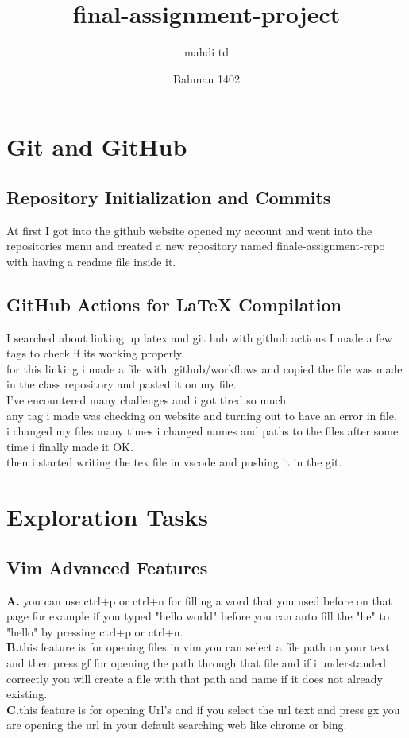 \documentclass{article}
\title{final-assignment-project}
\author{mahdi td}
\date{Bahman 1402}
\begin{document}
\maketitle
\newpage
\section{Git and GitHub}
\subsection{Repository Initialization and Commits}
At first I got into the github website opened my account and went into the repositories menu and created a new repository named finale-assignment-repo with having a readme file inside it.
\subsection{GitHub Actions for LaTeX Compilation}
I searched about linking up latex and git hub with github actions I made a few tags to check if its working properly.\\
for this linking i made a file with .github/workflows and copied the file was made in the class repository and pasted it on my file.\\
I've encountered many challenges and i got tired so much\\
any tag i made was checking on website and turning out to have an error in file.\\
i changed my files many times i changed names and paths to the files after some time i finally made it OK.\\
then i started writing the tex file in vscode and pushing it in the git.
\section{ Exploration Tasks}
\subsection{Vim Advanced Features}
\textbf{A.}  you can use ctrl+p or ctrl+n for filling a word that you used before on that page for example if you typed "hello world" before you can auto fill the "he" to "hello" by pressing ctrl+p or ctrl+n.\\
\textbf{B.}this feature is for opening files in vim.you can select a file path on your text and then press gf for opening the path through that file and if i understanded correctly you will create a file with that path and name if it does not already existing.\\
\textbf{C.}this feature is for opening Url's and if you select the url text and press gx you are opening the url in your default searching web like chrome or bing.\\
\end{document}
